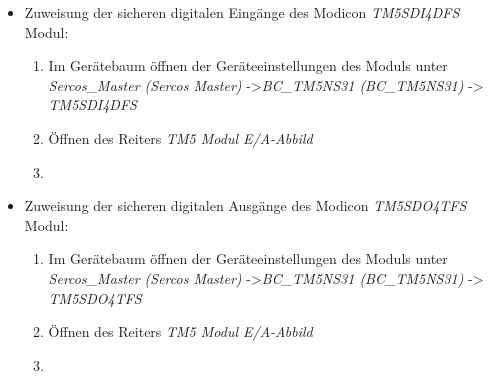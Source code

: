 \documentclass[../../../Bachelorarbeit.tex]{subfiles}
\begin{document}
\begin{itemize}
\begin{enumerate}
\begin{minipage}[t]{\linewidth}
{            }
            \label{fig:my-img27}
        \end{minipage}
    \end{enumerate}
    \item Zuweisung der sicheren digitalen Eingänge des Modicon \textit{TM5SDI4DFS} Modul:
    \begin{enumerate}
        \item Im Gerätebaum öffnen der Geräteeinstellungen des Moduls unter \textit{Sercos\_Master (Sercos Master)} ->\small \textit{BC\_TM5NS31 (BC\_TM5NS31)} -> \textit{TM5SDI4DFS}
        \item \normalsize Öffnen des Reiters \textit{TM5 Modul E/A-Abbild}
        \item \begin{minipage}[t]{\linewidth}
            \raggedright
            \label{fig:my-img28}
        \end{minipage}
    \end{enumerate}
    \item Zuweisung der sicheren digitalen Ausgänge des Modicon \textit{TM5SDO4TFS} Modul:
    \begin{enumerate}
        \item Im Gerätebaum öffnen der Geräteeinstellungen des Moduls unter \textit{Sercos\_Master (Sercos Master)} ->\small \textit{BC\_TM5NS31 (BC\_TM5NS31)} -> \textit{TM5SDO4TFS}
        \item \normalsize Öffnen des Reiters \textit{TM5 Modul E/A-Abbild}
        \item \begin{minipage}[t]{\linewidth}

\end{minipage}
\end{enumerate}
\end{itemize}
\end{document}
